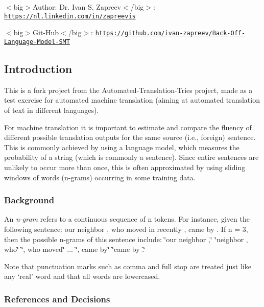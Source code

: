 $<$big$>$Author\+: Dr. Ivan S. Zapreev$<$/big$>$\+: \href{https://nl.linkedin.com/in/zapreevis}{\tt https\+://nl.\+linkedin.\+com/in/zapreevis}

$<$big$>$Git-\/\+Hub$<$/big$>$\+: \href{https://github.com/ivan-zapreev/Back-Off-Language-Model-SMT}{\tt https\+://github.\+com/ivan-\/zapreev/\+Back-\/\+Off-\/\+Language-\/\+Model-\/\+S\+M\+T}

\subsection*{Introduction}

This is a fork project from the Automated-\/\+Translation-\/\+Tries project, made as a test exercise for automated machine translation (aiming at automated translation of text in different languages).

For machine translation it is important to estimate and compare the fluency of different possible translation outputs for the same source (i.\+e., foreign) sentence. This is commonly achieved by using a language model, which measures the probability of a string (which is commonly a sentence). Since entire sentences are unlikely to occur more than once, this is often approximated by using sliding windows of words (n-\/grams) occurring in some training data.

\subsubsection*{Background}

An {\itshape n-\/gram} refers to a continuous sequence of n tokens. For instance, given the following sentence\+: our neighbor , who moved in recently , came by . If n = 3, then the possible n-\/grams of this sentence include\+: {\ttfamily  \char`\"{}our neighbor ,\char`\"{} \char`\"{}neighbor , who\char`\"{} \char`\"{}, who moved\char`\"{} ... \char`\"{}, came by\char`\"{} \char`\"{}came by .\char`\"{} }

Note that punctuation marks such as comma and full stop are treated just like any ‘real’ word and that all words are lowercased.

\subsubsection*{References and Decisions}

